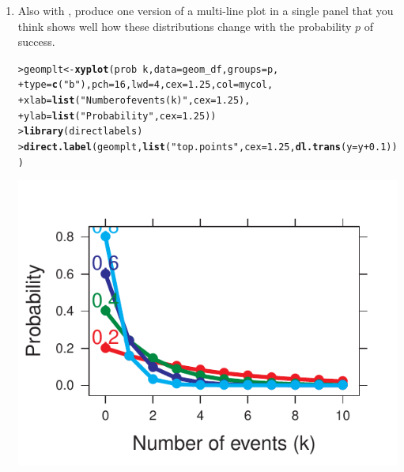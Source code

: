 \documentclass[11pt]{report}\usepackage[]{graphicx}\usepackage[]{color}
\makeatletter
\newcommand{\hlnum}[1]{\textcolor[rgb]{0.686,0.059,0.569}{#1}}%
\newcommand{\hlstr}[1]{\textcolor[rgb]{0.192,0.494,0.8}{#1}}%
\newcommand{\hlopt}[1]{\textcolor[rgb]{0,0,0}{#1}}%
\newcommand{\hlstd}[1]{\textcolor[rgb]{0.345,0.345,0.345}{#1}}%
\newcommand{\hlkwb}[1]{\textcolor[rgb]{0.69,0.353,0.396}{#1}}%
\newcommand{\hlkwc}[1]{\textcolor[rgb]{0.333,0.667,0.333}{#1}}%
\newcommand{\hlkwd}[1]{\textcolor[rgb]{0.737,0.353,0.396}{\textbf{#1}}}%
\newenvironment{kframe}{%
 \def\at@end@of@kframe{}%
 \ifinner\ifhmode%
  \def\at@end@of@kframe{\end{minipage}}%
  \begin{minipage}{\columnwidth}%
 \fi\fi%
 \def\FrameCommand##1{\hskip\@totalleftmargin \hskip-\fboxsep
 \colorbox{shadecolor}{##1}\hskip-\fboxsep
     \hskip-\linewidth \hskip-\@totalleftmargin \hskip\columnwidth}%
 \MakeFramed {\advance\hsize-\width
   \@totalleftmargin\z@ \linewidth\hsize
   \@setminipage}}%
 {\par\unskip\endMakeFramed%
 \at@end@of@kframe}
\newenvironment{knitrout}{}{} %
\renewenvironment{knitrout}{\small\renewcommand{\baselinestretch}{.85}}{} %
\makeatother
\begin{document}
\begin{Exercises}
\begin{enumerate}
\begin{ans}
\begin{knitrout}
\end{knitrout}
    \end{ans}
    
    \item Also with , produce one version of a multi-line plot
    in a single panel that you think shows well how these distributions change
    with the probability $p$ of success.
    \begin{ans}
\begin{knitrout}
\color{fgcolor}\begin{kframe}
\begin{alltt}
\hlstd{> }\hlstd{geomplt}\hlkwb{<-}\hlkwd{xyplot}\hlstd{(prob} \hlopt{~} \hlstd{k ,} \hlkwc{data} \hlstd{= geom_df,} \hlkwc{groups} \hlstd{= p,}
\hlstd{+ }                \hlkwc{type} \hlstd{=} \hlkwd{c}\hlstd{(}\hlstr{"b"}\hlstd{),} \hlkwc{pch} \hlstd{=} \hlnum{16}\hlstd{,} \hlkwc{lwd} \hlstd{=} \hlnum{4}\hlstd{,} \hlkwc{cex} \hlstd{=} \hlnum{1.25}\hlstd{,} \hlkwc{col} \hlstd{= mycol,}
\hlstd{+ }                \hlkwc{xlab} \hlstd{=} \hlkwd{list}\hlstd{(}\hlstr{"Number of events (k)"}\hlstd{,} \hlkwc{cex} \hlstd{=} \hlnum{1.25}\hlstd{),}
\hlstd{+ }                \hlkwc{ylab} \hlstd{=} \hlkwd{list}\hlstd{(}\hlstr{"Probability"}\hlstd{,} \hlkwc{cex} \hlstd{=} \hlnum{1.25}\hlstd{))}
\hlstd{> }\hlkwd{library}\hlstd{(directlabels)}
\hlstd{> }\hlkwd{direct.label}\hlstd{(geomplt,} \hlkwd{list}\hlstd{(}\hlstr{"top.points"}\hlstd{,} \hlkwc{cex} \hlstd{=} \hlnum{1.25}\hlstd{,} \hlkwd{dl.trans}\hlstd{(}\hlkwc{y} \hlstd{= y} \hlopt{+} \hlnum{0.1}\hlstd{)))}
\end{alltt}
\end{kframe}

\centerline{\includegraphics{soln/fig/ex3_2b-1} }




\end{knitrout}
\end{ans}
\end{enumerate}
\end{Exercises}
\end{document}

